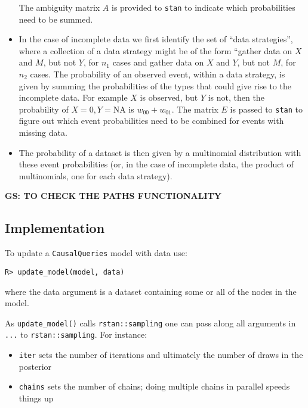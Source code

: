 \documentclass[
  11pt,
  article]{jss}
\providecommand{\tightlist}{%
  \setlength{\itemsep}{0pt}\setlength{\parskip}{0pt}}\usepackage{longtable,booktabs,array}
\begin{document}
\begin{itemize}
  The ambiguity matrix \(A\) is provided to \texttt{stan} to indicate
  which probabilities need to be summed.
\item
  In the case of incomplete data we first identify the set of ``data
  strategies'', where a collection of a data strategy might be of the
  form ``gather data on \(X\) and \(M\), but not \(Y\), for \(n_1\)
  cases and gather data on \(X\) and \(Y\), but not \(M\), for \(n_2\)
  cases. The probability of an observed event, within a data strategy,
  is given by summing the probabilities of the types that could give
  rise to the incomplete data. For example \(X\) is observed, but \(Y\)
  is not, then the probability of \(X=0, Y = \text{NA}\) is
  \(w_{00} +w_{01}\). The matrix \(E\) is passed to \texttt{stan} to
  figure out which event probabilities need to be combined for events
  with missing data.
\item
  The probability of a dataset is then given by a multinomial
  distribution with these event probabilities (or, in the case of
  incomplete data, the product of multinomials, one for each data
  strategy).
\end{itemize}

\textbf{GS: TO CHECK THE PATHS FUNCTIONALITY}

\hypertarget{implementation}{%
\subsection{Implementation}\label{implementation}}

To update a \texttt{CausalQueries} model with data use:

\begin{verbatim}
R> update_model(model, data)
\end{verbatim}

where the data argument is a dataset containing some or all of the nodes
in the model.

As \texttt{update\_model()} calls \texttt{rstan::sampling} one can pass
along all arguments in \texttt{...} to \texttt{rstan::sampling}. For
instance:

\begin{itemize}
\tightlist
\item
  \texttt{iter} sets the number of iterations and ultimately the number
  of draws in the posterior
\item
  \texttt{chains} sets the number of chains; doing multiple chains in
  parallel speeds things up
\end{itemize}
\end{document}
